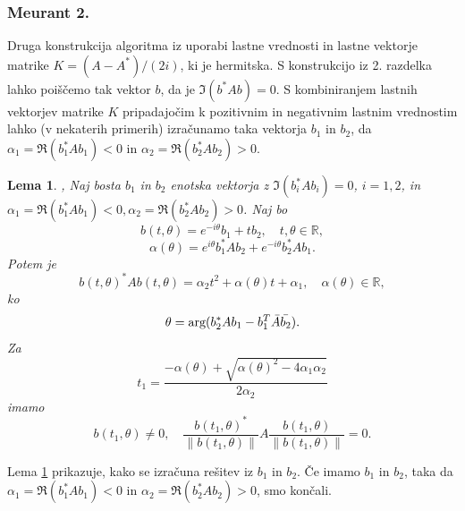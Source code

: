 \documentclass[12pt,a4paper]{amsart}
\theoremstyle{definition}
\theoremstyle{plain}
\newtheorem{lema}[definicija]{Lema}
\newcommand{\R}{\mathbb R}
\newcommand{\norm}[1]{\left\lVert#1\right\rVert}
\begin{document}
\subsubsection{Meurant 2.}\label{Meurant 2}
Druga konstrukcija algoritma iz \cite{meurant} uporabi lastne vrednosti in lastne vektorje matrike $K=(A-A^\ast)/(2i)$, ki je hermitska.
S konstrukcijo iz 2. razdelka lahko poiščemo tak vektor $b$, da je $\Im(b^\ast Ab)=0$. 
S kombiniranjem lastnih vektorjev matrike $K$ pripadajočim k pozitivnim in negativnim lastnim vrednostim lahko (v nekaterih primerih) izračunamo taka vektorja $b_1$ in $b_2$, da $\alpha_1=\Re(b_1^\ast Ab_1)<0$ in $\alpha_2=\Re(b_2^\ast Ab_2)>0$. 
\begin{lema}\label{komp}\cite{meurant},\cite{num}
Naj bosta $b_1$ in $b_2$ enotska vektorja z $\Im(b_i^\ast Ab_i)=0$, $i=1,2$, in $\alpha_1=\Re(b_1^\ast Ab_1)<0, \alpha_2=\Re(b_2^\ast Ab_2)>0$. Naj bo 
$$b(t,\theta)=e^{-i\theta}b_1 + tb_2, \quad t,\theta \in \R,$$ 
$$\alpha(\theta)=e^{i\theta}b_1^\ast Ab_2 +e^{-i\theta}b_2^\ast Ab_1.$$
Potem je 
$$b(t,\theta)^\ast Ab(t,\theta)=\alpha_2 t^2 +\alpha(\theta)t+\alpha_1,\quad \alpha(\theta)\in\R,$$ ko 
$$\theta= \textnormal{arg}(b_2^\ast Ab_1 -b_1^T\bar{A}\bar{b_2}).$$ Za 
$$t_1 = \frac{-\alpha(\theta) + \sqrt{\alpha(\theta)^2 - 4\alpha_1 \alpha_2}}{2\alpha_2}$$ imamo 
$$b(t_1, \theta) \not=0,\quad  \frac{b(t_1,\theta)^\ast}{\norm{b(t_1,\theta)}}A\frac{b(t_1,\theta)}{\norm{b(t_1,\theta)}}=0.$$

\end{lema}
Lema \ref{komp} prikazuje, kako se izračuna rešitev iz $b_1$ in $b_2$. Če imamo $b_1$ in $b_2$, taka da  $\alpha_1=\Re(b_1^\ast Ab_1)<0$ in $\alpha_2=\Re(b_2^\ast Ab_2)>0$, smo končali.
\end{document}
